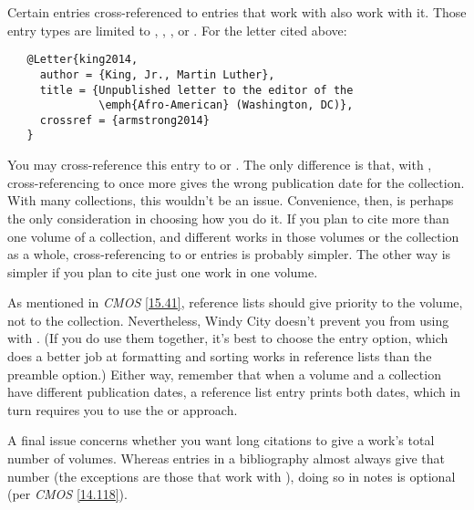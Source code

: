 \documentclass[11pt,letterpaper,oneside]{article}
\begin{document}
Certain entries cross-referenced to entries that work with
 also work with it. Those entry types are limited to
, , , or
. For the letter cited above:

\begin{verbatim}
   @Letter{king2014,
     author = {King, Jr., Martin Luther},
     title = {Unpublished letter to the editor of the
              \emph{Afro-American} (Washington, DC)},
     crossref = {armstrong2014}
   }
\end{verbatim}

\noindent You may cross-reference this entry to
 or . The only difference
is that, with , cross-referencing to
 once more gives the wrong publication date for
the collection. With many collections, this wouldn't be an issue.
Convenience, then, is perhaps the only consideration in choosing how
you do it. If you plan to cite more than one volume of a collection,
and different works in those volumes or the collection as a whole,
cross-referencing to  or  entries
is probably simpler. The other way is simpler if you plan to cite just
one work in one volume.

As mentioned in \textit{CMOS} \ref{15.41}, reference lists should give
priority to the volume, not to the collection. Nevertheless, Windy
City doesn't prevent you from using  with .
(If you do use them together, it's best to choose the 
entry option, which does a better job at formatting and sorting works
in reference lists than the  preamble option.) Either
way, remember that when a volume and a collection have different
publication dates, a reference list entry prints both dates, which in
turn requires you to use the  or 
approach.

\begin{refonly}
\nocite{armstrong2014}
\end{refonly}

A final issue concerns whether you want long citations to give a
work's total number of volumes. Whereas entries in a bibliography
almost always give that number (the exceptions are those that work
with ), doing so in notes is optional (per \textit{CMOS}
\ref{14.118}).
\end{document}
